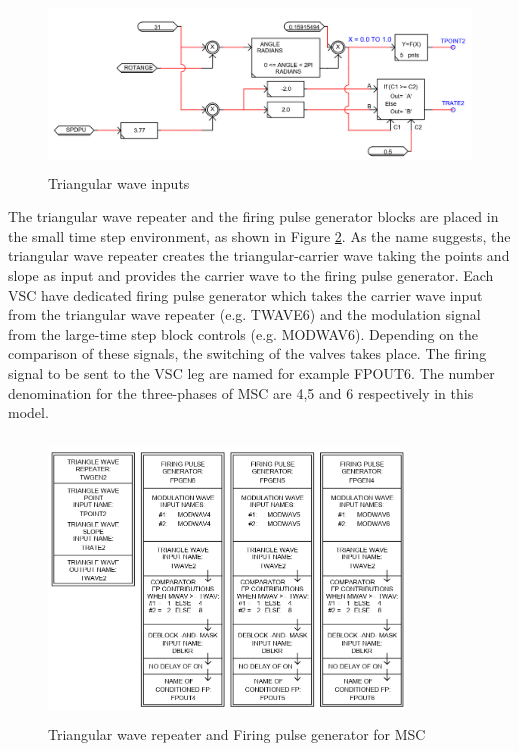\begin{figure}[H]
\centering
    \includegraphics[height = 4.5cm,width = 12.5cm]{Diagrams/Appendix_A/Triangular_wave_input.PNG}
    \caption{Triangular wave inputs}
    \label{fig:Triangular_wave_input}
\end{figure}

The triangular wave repeater and the firing pulse generator blocks are placed in the small time step environment, as shown in Figure \ref{fig:Firing_blocks_MSC}. As the name suggests, the triangular wave repeater creates the triangular-carrier wave taking the points and slope as input and provides the carrier wave to the firing pulse generator. Each \gls{VSC} have dedicated firing pulse generator which takes the carrier wave input from the triangular wave repeater (e.g. TWAVE6) and the modulation signal from the large-time step block controls (e.g. MODWAV6). Depending on the comparison of these signals, the switching of the valves takes place. The firing signal to be sent to the \gls{VSC} leg are named for example FPOUT6. The number denomination for the three-phases of \gls{MSC} are 4,5 and 6 respectively in this model.  

\begin{figure}[H]
\centering
    \includegraphics[height = 7.5cm,width = 9.5cm]{Diagrams/Appendix_A/Firing_blocks_MSC.PNG}
    \caption{Triangular wave repeater and Firing pulse generator for MSC}
    \label{fig:Firing_blocks_MSC}
\end{figure}

